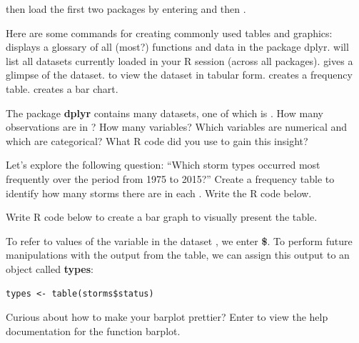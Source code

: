 then load the first two packages by entering \textbf{} and then \textbf{}.

\bigskip

\bbox
Here are some commands for creating commonly used tables and graphics:
\bi
\ii \textbf{} displays a glossary of all (most?) functions and data in the package dplyr.
\ii \textbf{} will list all datasets currently loaded in your R session (across all packages).
\ii \textbf{} gives a glimpse of the dataset.
\ii \textbf{} to view the dataset in tabular form.
\ii \textbf{} creates a frequency table.
\ii \textbf{} creates a bar chart.
\ei
\ebox

\bb
\ii The package \textbf{dplyr} contains many datasets, one of which is \textbf{} . How many observations are in  \textbf{}? How many variables? Which variables are numerical and which are categorical? What R code did you use to gain this insight?


\clearpage


\ii Let's explore the following question: ``Which storm types occurred most frequently over the period from 1975 to 2015?''
\bb
\ii Create a frequency table to identify how many storms there are in each \textbf{}. Write the R code below. \vfill

\ii  Write R code below to create a bar graph to visually present the table. \vfill
\ee
\ee

\bbox
\bi
\ii To refer to values of the  variable \textbf{} in the dataset  \textbf{} , we enter \textbf{\$}.
\ii To perform future manipulations with the output from the table, we can assign this output  to an object called \textbf{types}: 
\begin{lstlisting}
types <- table(storms$status)
\end{lstlisting}
\ii Curious about how to make your barplot prettier? Enter \textbf{} to view the help documentation for the function barplot.
\ei
\ebox

